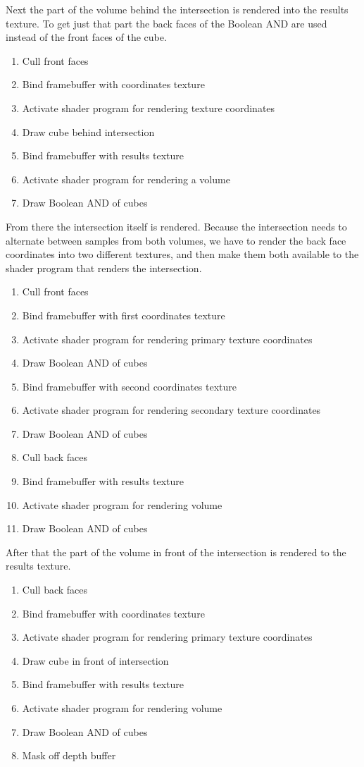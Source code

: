 \documentclass{report}
\begin{document}
Next the part of the volume behind the intersection is rendered into the results
texture.  To get just that part the back faces of the Boolean AND are used
instead of the front faces of the cube.

\begin{enumerate}
  \item Cull front faces
  \item Bind framebuffer with coordinates texture
  \item Activate shader program for rendering texture coordinates
  \item Draw cube behind intersection
  \item Bind framebuffer with results texture
  \item Activate shader program for rendering a volume
  \item Draw Boolean AND of cubes
\end{enumerate}

From there the intersection itself is rendered.  Because the intersection needs
to alternate between samples from both volumes, we have to render the back face
coordinates into two different textures, and then make them both available to
the shader program that renders the intersection.

\begin{enumerate}
  \item Cull front faces
  \item Bind framebuffer with first coordinates texture
  \item Activate shader program for rendering primary texture coordinates
  \item Draw Boolean AND of cubes
  \item Bind framebuffer with second coordinates texture
  \item Activate shader program for rendering secondary texture coordinates
  \item Draw Boolean AND of cubes
  \item Cull back faces
  \item Bind framebuffer with results texture
  \item Activate shader program for rendering volume
  \item Draw Boolean AND of cubes
\end{enumerate}

After that the part of the volume in front of the intersection is rendered to
the results texture.

\begin{enumerate}
  \item Cull back faces
  \item Bind framebuffer with coordinates texture
  \item Activate shader program for rendering primary texture coordinates
  \item Draw cube in front of intersection
  \item Bind framebuffer with results texture
  \item Activate shader program for rendering volume
  \item Draw Boolean AND of cubes
  \item Mask off depth buffer
\end{enumerate}
\end{document}
